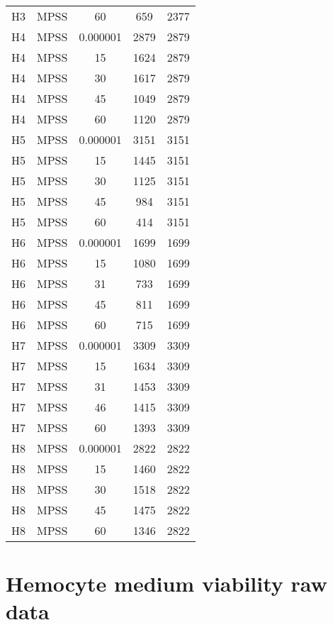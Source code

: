 \begin{center}
\begin{longtable}{ccccc}
H3	&	MPSS	&	60	&	659	&	2377	\\
H4	&	MPSS	&	0.000001	&	2879	&	2879	\\
H4	&	MPSS	&	15	&	1624	&	2879	\\
H4	&	MPSS	&	30	&	1617	&	2879	\\
H4	&	MPSS	&	45	&	1049	&	2879	\\
H4	&	MPSS	&	60	&	1120	&	2879	\\
H5	&	MPSS	&	0.000001	&	3151	&	3151	\\
H5	&	MPSS	&	15	&	1445	&	3151	\\
H5	&	MPSS	&	30	&	1125	&	3151	\\
H5	&	MPSS	&	45	&	984	&	3151	\\
H5	&	MPSS	&	60	&	414	&	3151	\\
H6	&	MPSS	&	0.000001	&	1699	&	1699	\\
H6	&	MPSS	&	15	&	1080	&	1699	\\
H6	&	MPSS	&	31	&	733	&	1699	\\
H6	&	MPSS	&	45	&	811	&	1699	\\
H6	&	MPSS	&	60	&	715	&	1699	\\
H7	&	MPSS	&	0.000001	&	3309	&	3309	\\
H7	&	MPSS	&	15	&	1634	&	3309	\\
H7	&	MPSS	&	31	&	1453	&	3309	\\
H7	&	MPSS	&	46	&	1415	&	3309	\\
H7	&	MPSS	&	60	&	1393	&	3309	\\
H8	&	MPSS	&	0.000001	&	2822	&	2822	\\
H8	&	MPSS	&	15	&	1460	&	2822	\\
H8	&	MPSS	&	30	&	1518	&	2822	\\
H8	&	MPSS	&	45	&	1475	&	2822	\\
H8	&	MPSS	&	60	&	1346	&	2822	\\
\end{longtable}    
\end{center}

\pagebreak


\section{Hemocyte medium viability raw data}


